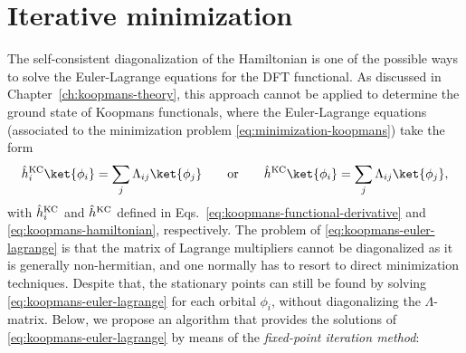 \chapter{Iterative minimization\label{app:iterative-minimization}}

The self-consistent diagonalization of the Hamiltonian is one of the possible ways to solve the Euler-Lagrange equations for the DFT functional. As discussed in Chapter~\ref{ch:koopmans-theory}, this approach cannot be applied to determine the ground state of Koopmans functionals, where the Euler-Lagrange equations (associated to the minimization problem \eqref{eq:minimization-koopmans}) take the form
%
\begin{equation}
    \hat{h}^{\rm KC}_i \ket{\phi_i} = \sum_j \Lambda_{ij} \ket{\phi_j} \qquad \text{or} \qquad
    \hat{h}^{\rm KC} \ket{\phi_i} = \sum_j \Lambda_{ij} \ket{\phi_j} ,
    \label{eq:koopmans-euler-lagrange}
\end{equation}
%
with $\hat{h}^{\rm KC}_i$ and $\hat{h}^{\rm KC}$ defined in Eqs.~\eqref{eq:koopmans-functional-derivative} and \eqref{eq:koopmans-hamiltonian}, respectively. The problem of \cref{eq:koopmans-euler-lagrange} is that the matrix of Lagrange multipliers cannot be diagonalized as it is generally non-hermitian, and one normally has to resort to direct minimization techniques. Despite that, the stationary points can still be found by solving \cref{eq:koopmans-euler-lagrange} for each orbital $\phi_i$, without diagonalizing the $\Lambda$-matrix. Below, we propose an algorithm that provides the solutions of \cref{eq:koopmans-euler-lagrange} by means of the \emph{fixed-point iteration method}:
%
